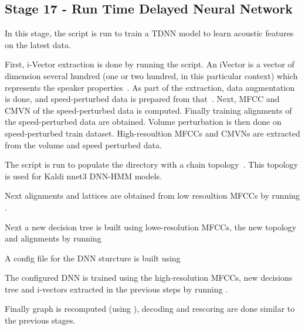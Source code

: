 \subsection{ Stage 17 - Run Time Delayed Neural Network}
In this stage, the  script is run to train a TDNN model to learn acoustic features on the latest data.

First, i-Vector extraction is done by running the  script. An iVector is a vector of dimension several hundred (one or two hundred, in this particular context) which represents the speaker properties~\cite{ivector}. As part of the extraction, data augmentation is done, and speed-perturbed data is prepared from that~\cite{understandingkaldi}. Next, MFCC and CMVN of the speed-perturbed data is computed. Finally training alignments of the speed-perturbed data are obtained. Volume perturbation is then done on speed-perturbed train dataset. High-resoultion MFCCs and CMVNs are extracted from the volume and speed perturbed data.

The  script is run to populate the  directory with a chain topology~\cite{chaintop}. This topology is used for Kaldi nnet3 DNN-HMM models.

Next alignments and lattices are obtained from low resoultion MFCCs by running .

Next a new decision tree is built using lowe-resolution MFCCs, the new topology and alignments by running 

A config file for the DNN sturcture is built using 

The configured DNN is trained using the high-resolution MFCCs, new decisions tree and i-vectors extracted in the previous steps by running .

Finally graph is recomputed (using ), decoding and rescoring are done similar to the previous stages.